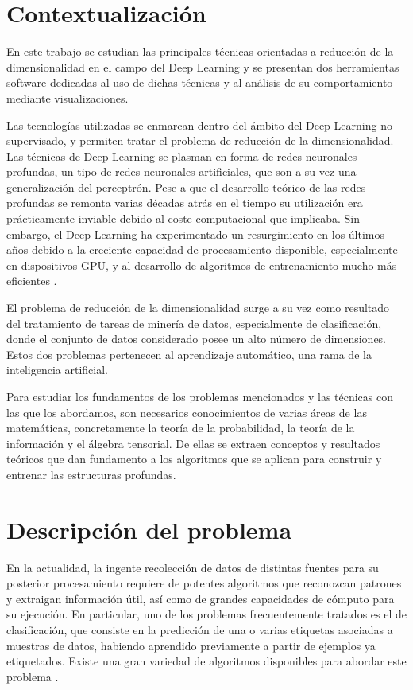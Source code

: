 \section{Contextualización}

En este trabajo se estudian las principales técnicas orientadas a reducción de la dimensionalidad en el campo del Deep Learning y se presentan dos herramientas software dedicadas al uso de dichas técnicas y al análisis de su comportamiento mediante visualizaciones.

Las tecnologías utilizadas se enmarcan dentro del ámbito del Deep Learning no supervisado, y permiten tratar el problema de reducción de la dimensionalidad. Las técnicas de Deep Learning se plasman en forma de redes neuronales profundas, un tipo de redes neuronales artificiales, que son a su vez una generalización del perceptrón. Pese a que el desarrollo teórico de las redes profundas se remonta varias décadas atrás en el tiempo \autocite{Rumelhart} \autocite{lecun1989backprop} su utilización era prácticamente inviable debido al coste computacional que implicaba. Sin embargo, el Deep Learning ha experimentado un resurgimiento en los últimos años debido a la creciente capacidad de procesamiento disponible, especialmente en dispositivos GPU, y al desarrollo de algoritmos de entrenamiento mucho más eficientes \autocite{hinton2007multiple} \autocite{hinton06}.

El problema de reducción de la dimensionalidad surge a su vez como resultado del tratamiento de tareas de minería de datos, especialmente de clasificación, donde el conjunto de datos considerado posee un alto número de dimensiones. Estos dos problemas pertenecen al aprendizaje automático, una rama de la inteligencia artificial.

Para estudiar los fundamentos de los problemas mencionados y las técnicas con las que los abordamos, son necesarios conocimientos de varias áreas de las matemáticas, concretamente la teoría de la probabilidad, la teoría de la información y el álgebra tensorial. De ellas se extraen conceptos y resultados teóricos que dan fundamento a los algoritmos que se aplican para construir y entrenar las estructuras profundas.

\section{Descripción del problema}

En la actualidad, la ingente recolección de datos de distintas fuentes para su posterior procesamiento requiere de potentes algoritmos que reconozcan patrones y extraigan información útil, así como de grandes capacidades de cómputo para su ejecución. En particular, uno de los problemas frecuentemente tratados es el de clasificación, que consiste en la predicción de una o varias etiquetas asociadas a muestras de datos, habiendo aprendido previamente a partir de ejemplos ya etiquetados. Existe una gran variedad de algoritmos disponibles para abordar este problema \autocite{kotsiantis2007}.

